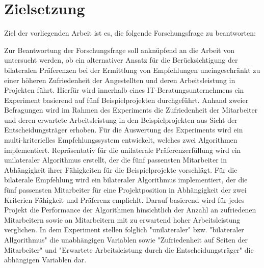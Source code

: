 \section{Zielsetzung}
\label{sec:einletung:zielsetzung}
Ziel der vorliegenden Arbeit ist es, die folgende Forschungsfrage zu beantworten:

\forschungsfrage

Zur Beantwortung der Forschungsfrage soll anknüpfend an die Arbeit von \textcite[S. 1ff.]{link:booklet} untersucht werden, ob ein alternativer Ansatz für die Berücksichtigung der bilateralen Präferenzen bei der Ermittlung von Empfehlungen uneingeschränkt zu einer höheren Zufriedenheit der Angestellten und deren Arbeitsleistung in Projekten führt.
Hierfür wird innerhalb eines IT-Beratungsunternehmens ein Experiment basierend auf fünf Beispielprojekten durchgeführt.
Anhand zweier Befragungen wird im Rahmen des Experiments die Zufriedenheit der Mitarbeiter und deren erwartete Arbeitsleistung in den Beispielprojekten aus Sicht der Entscheidungsträger erhoben.
Für die Auswertung des Experiments wird ein multi-kriterielles Empfehlungssystem entwickelt, welches zwei Algorithmen implementiert.
Repräsentativ für die unilaterale Präferenzerfüllung wird ein unilateraler Algorithmus erstellt, der die fünf passensten Mitarbeiter in Abhängigkeit ihrer Fähigkeiten für die Beispielprojekte vorschlägt.
Für die bilaterale Empfehlung wird ein bilateraler Algorithmus implementiert, der die fünf passensten Mitarbeiter für eine Projektposition in Abhängigkeit der zwei Kriterien Fähigkeit und Präferenz empfiehlt.
Darauf basierend wird für jedes Projekt die Performance der Algorithmen hinsichtlich der Anzahl an zufriedenen Mitarbeitern sowie an Mitarbeitern mit zu erwartend hoher Arbeitsleistung verglichen.
In dem Experiment stellen folglich "unilateraler" bzw. "bilateraler Allgorithmus" die unabhängigen Variablen sowie "Zufriedenheit auf Seiten der Mitarbeiter" und "Erwartete Arbeitsleistung durch die Entscheidungsträger" die abhängigen Variablen dar.



